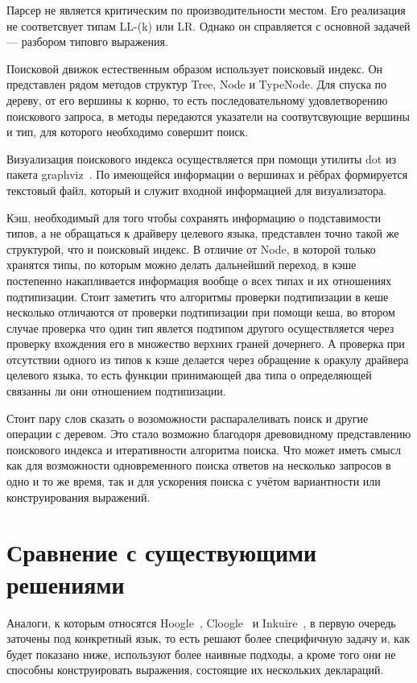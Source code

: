 \documentclass[times]{itmo-student-thesis}
\begin{document}
	Парсер не является критическим по производительности местом. Его реализация не соответсвует типам LL-(k) или LR. Однако он справляется с основной задачей --- разбором типовго выражения.
	
	Поисковой движок естественным образом использует поисковый индекс. Он представлен рядом методов структур Tree, Node и TypeNode. Для спуска по дереву, от его вершины к корню, то есть последовательному удовлетворению поискового запроса, в методы передаются указатели на соотвутсвующие вершины и тип, для которого необходимо совершит поиск.
	
	Визуализация поискового индекса осуществляется при помощи утилиты dot из пакета graphviz~\cite{dotgraphvizdocumentation}. По имеющейся информации о вершинах и рёбрах формируется текстовый файл, который и служит входной информацией для визуализатора.
	
	Кэш, необходимый для того чтобы сохранять информацию о подставимости типов, а не обращаться к драйверу целевого языка, представлен точно такой же структурой, что и поисковый индекс. В отличие от Node, в которой только хранятся типы, по которым можно делать дальнейший переход, в кэше постепенно накапливается информация вообще о всех типах и их отношениях подтипизации. Стоит заметить что алгоритмы проверки подтипизации в кеше несколько отличаются от проверки подтипизации при помощи кеша, во втором случае проверка что один тип явлется подтипом другого осуществляется через проверку вхождения его в множество верхних граней дочернего. А проверка при отсутствии одного из типов к кэше делается через обращение к оракулу драйвера целевого языка, то есть функции принимающей два типа о определяющей связанны ли они отношением подтипизации.
	
	Стоит пару слов сказать о возоможности распаралеливать поиск и другие операции с деревом. Это стало возможно благодоря древовидному представлению поискового индекса и итеративности алгоритма поиска. Что может иметь смысл как для возможности одновременного поиска ответов на несколько запросов в одно и то же время, так и для ускорения поиска с учётом вариантности или конструирования выражений.
	
	\section{Сравнение с существующими решениями}
	Аналоги, к которым относятся Hoogle~\cite{hoogle}, Cloogle~\cite{cloogle} и Inkuire~\cite{inkuire}, в первую очередь заточены под конкретный язык, то есть решают более специфичную задачу и, как будет показано ниже, используют более наивные подходы, а кроме того они не способны конструировать выражения, состоящие их нескольких деклараций.
	
\end{document}

